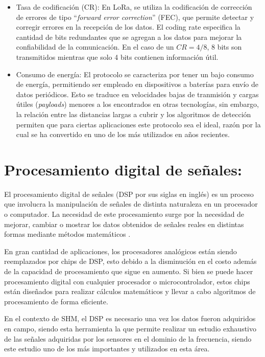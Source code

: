 \begin{itemize}
    \item Tasa de codificación (CR): En LoRa, se utiliza la codificación de corrección de errores de tipo ``\textit{forward error correction}'' (FEC), que permite detectar y corregir errores en la recepción de los datos. El coding rate especifica la cantidad de bits redundantes que se agregan a los datos para mejorar la confiabilidad de la comunicación. En el caso de un $CR = 4 / 8$, 8 bits son transmitidos mientras que solo 4 bits contienen información útil.
    
    
    \item Consumo de energía: El protocolo se caracteriza por tener un bajo consumo de energía, permitiendo ser empleado en dispositivos a baterías para envío de datos periódicos. Esto se traduce en velocidades bajas de tranmisión y cargas útiles (\textit{payloads}) menores a los encontrados en otras tecnologías, sin embargo, la relación entre las distancias largas a cubrir y los algoritmos de detección permiten que para ciertas aplicaciones este protocolo sea el ideal, razón por la cual se ha convertido en uno de los más utilizados en años recientes.
\end{itemize}

\section{Procesamiento digital de señales:}

El procesamiento digital de señales (DSP por sus siglas en inglés) es un proceso que involucra la manipulación de señales de distinta naturaleza en un procesador o computador. La necesidad de este procesamiento surge por la necesidad de mejorar, cambiar o mostrar los datos obtenidos de señales reales en distintas formas mediante métodos matemáticos \citep{proakisDSP}.

En gran cantidad de aplicaciones, los procesadores analógicos están siendo reemplazados por chips de DSP, esto debido a la disminución en el costo además de la capacidad de procesamiento que sigue en aumento. Si bien se puede hacer procesamiento digital con cualquier procesador o microcontrolador, estos chips están diseñados para realizar cálculos matemáticos y llevar a cabo algoritmos de procesamiento de forma eficiente. 

En el contexto de SHM, el DSP es necesario una vez los datos fueron adquiridos en campo, siendo esta herramienta la que permite realizar un estudio exhaustivo de las señales adquiridas por los sensores en el dominio de la frecuencia, siendo este estudio uno de los más importantes y utilizados en esta área.

